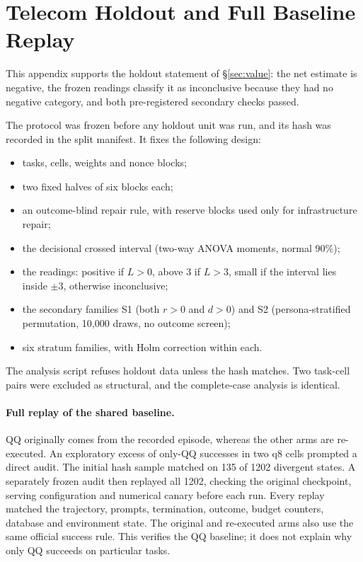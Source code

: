 \section{Telecom Holdout and Full Baseline Replay}
\label{app:prereg}

This appendix supports the holdout statement of \S\ref{sec:value}: the net estimate is negative, the frozen readings classify it as inconclusive because they had no negative category, and both pre-registered secondary checks passed.

The protocol was frozen before any holdout unit was run, and its hash was recorded in the split manifest. %
It fixes the following design:
\begin{itemize}[leftmargin=*,itemsep=1pt,topsep=2pt]
\item tasks, cells, weights and nonce blocks;
\item two fixed halves of six blocks each;
\item an outcome-blind repair rule, with reserve blocks used only for infrastructure repair;
\item the decisional crossed interval (two-way ANOVA moments, normal 90\%);
\item the readings: positive if $L>0$, above 3\pp{} if $L>3$, small if the interval lies inside $\pm$3\pp{}, otherwise inconclusive;
\item the secondary families S1 (both $r>0$ and $d>0$) and S2 (persona-stratified permutation, 10{,}000 draws, no outcome screen);
\item six stratum families, with Holm correction within each.
\end{itemize}
The analysis script refuses holdout data unless the hash matches. Two task-cell pairs were excluded as structural, and the complete-case analysis is identical. %

\paragraph{Full replay of the shared baseline.} QQ originally comes from the recorded episode, whereas the other arms are re-executed. An exploratory excess of only-QQ successes in two q8 cells prompted a direct audit. The initial hash sample matched on 135 of 1202 divergent states. A separately frozen audit then replayed all 1202, checking the original checkpoint, serving configuration and numerical canary before each run. Every replay matched the trajectory, prompts, termination, outcome, budget counters, database and environment state. The original and re-executed arms also use the same official success rule. This verifies the QQ baseline; it does not explain why only QQ succeeds on particular tasks. %

